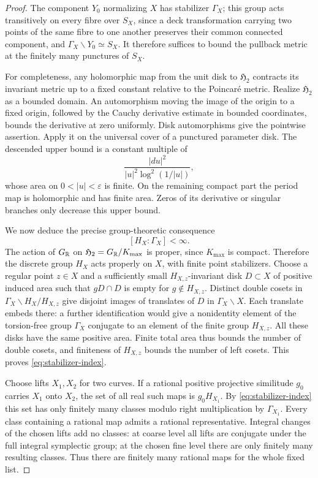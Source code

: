 \begin{proof}
The component $Y_0$ normalizing $X$ has stabilizer
$\Gamma_X$; this group acts transitively on every fibre over $S_X$, since a deck
transformation carrying two points of the same fibre to one another
preserves their common connected component, and
$\Gamma_X\backslash Y_0\simeq S_X$.  It therefore suffices to bound the
pullback metric at the finitely many punctures of $S_X$.

For completeness, any holomorphic map from the unit disk to
$\mathfrak H_2$ contracts its invariant metric up to a fixed constant
relative to the Poincar\'e metric.  Realize $\mathfrak H_2$ as a bounded
domain.  An automorphism moving the image of the origin to a fixed
origin, followed by the Cauchy derivative estimate in bounded
coordinates, bounds the derivative at zero uniformly.  Disk
automorphisms give the pointwise assertion.  Apply it on the universal
cover of a punctured parameter disk.  The descended upper bound is a
constant multiple of
\[
 \frac{|du|^2}{|u|^2\log^2(1/|u|)},
\]
whose area on $0<|u|<\varepsilon$ is finite.  On the remaining compact
part the period map is holomorphic and has finite area.  Zeros of its
derivative or singular branches only decrease this upper bound.

We now deduce the precise group-theoretic consequence
\begin{equation}\label{eq:stabilizer-index}
 [H_X:\Gamma_X]<\infty.
\end{equation}
The action of $G_{\mathbb R}$ on $\mathfrak H_2=G_{\mathbb R}/K_{\mathrm{max}}$ is
proper, since $K_{\mathrm{max}}$ is compact.  Therefore the discrete
group $H_X$ acts properly on $X$, with finite point stabilizers.  Choose
a regular point $z\in X$ and a sufficiently small $H_{X,z}$-invariant
disk $D\subset X$ of positive induced area such that $gD\cap D$ is
empty for $g\notin H_{X,z}$.  Distinct double cosets in
$\Gamma_X\backslash H_X/H_{X,z}$ give disjoint images of translates of
$D$ in $\Gamma_X\backslash X$.  Each translate embeds there: a further
identification would give a nonidentity element of the torsion-free
group $\Gamma_X$ conjugate to an element of the finite group $H_{X,z}$.
All these disks have the same positive area.  Finite total area thus
bounds the number of double cosets, and finiteness of $H_{X,z}$ bounds
the number of left cosets.  This proves \eqref{eq:stabilizer-index}.

Choose lifts $X_1,X_2$ for two curves.  If a rational positive projective
similitude $g_0$ carries $X_1$ onto $X_2$, the set of all real such
maps is $g_0H_{X_1}$.  By \eqref{eq:stabilizer-index} this set has only
finitely many classes modulo right multiplication by
$\Gamma_{X_1}$.  Every class containing a rational map admits a rational
representative.  Integral changes of the chosen lifts add no classes:
at coarse level all lifts are conjugate under the full integral
symplectic group; at the chosen fine level there are only finitely
many resulting classes.  Thus there are finitely many rational maps
for the whole fixed list.


\end{proof}
